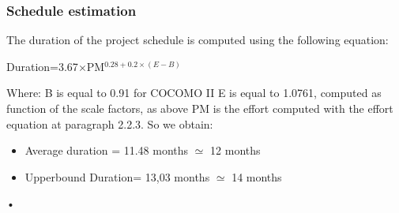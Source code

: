 \documentclass[10pt, a4paper,titlepage]{article}
\begin{document}
\subsubsection{Schedule estimation}
The duration of the project schedule is computed using the following equation:
\begin{center}
Duration=3.67$\times$PM$^{0.28+0.2\times(E-B)}$
\end{center}
Where:
B is equal to 0.91 for COCOMO II 
E is equal to 1.0761, computed as function of the scale factors, as above
PM is the effort computed with the effort equation at paragraph 2.2.3.
So we obtain:
\begin{itemize}
\item Average duration = 11.48 months $\simeq$ 12 months
\item Upperbound Duration= 13,03 months $\simeq$ 14 months
\end{itemize}•
\pagebreak
\end{document}
